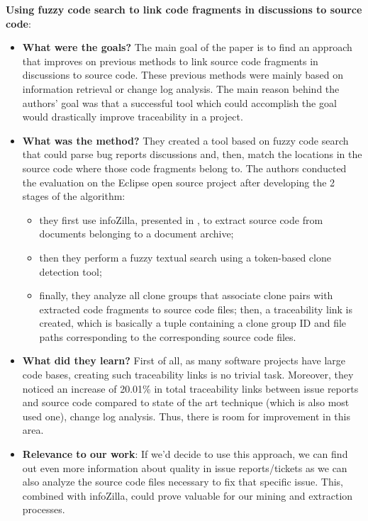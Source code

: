\documentclass{mprop}
\begin{document}
\textbf{Using fuzzy code search to link code fragments in discussions to source code}\cite{bettenburg2012using}:
\begin{itemize}
  \item \textbf{What were the goals?}
    The main goal of the paper is to find an approach that improves on
    previous methods to link source code fragments in discussions to source code.
    These previous methods were mainly based on information retrieval or 
    change log analysis. The main reason behind the authors' goal was
    that a successful tool which could accomplish the goal would drastically
    improve traceability in a project.
  \item \textbf{What was the method?}
    They created a tool based on fuzzy code search that could parse bug reports
    discussions and, then, match the locations in the source code where those
    code fragments belong to. The authors conducted the evaluation on the Eclipse
    open source project after developing the 2 stages of the algorithm:
      \begin{itemize}
        \item they first use infoZilla, presented in \cite{bettenburg2008extracting},
        to extract source code from documents belonging to a document archive;
        \item then they perform a fuzzy textual search using a token-based clone
        detection tool;
        \item finally, they analyze all clone groups that associate clone pairs with
        extracted code fragments to source code files; then, a traceability link is created,
        which is basically a tuple containing a clone group ID and file paths corresponding
        to the corresponding source code files.
      \end{itemize}
  \item \textbf{What did they learn?}
    First of all, as many software projects have large code bases, creating such 
    traceability links is no trivial task. Moreover, they noticed an increase of 20.01\%
    in total traceability links between issue reports and source code compared to state of the art
    technique (which is also most used one), change log analysis. Thus, there is room for
    improvement in this area.
  \item \textbf{Relevance to our work}:
    If we'd decide to use this approach, we can find out even more information about
    quality in issue reports/tickets as we can also analyze the source code files necessary
    to fix that specific issue. This, combined with infoZilla, could prove valuable for our
    mining and extraction processes.
\end{itemize}
\end{document}
